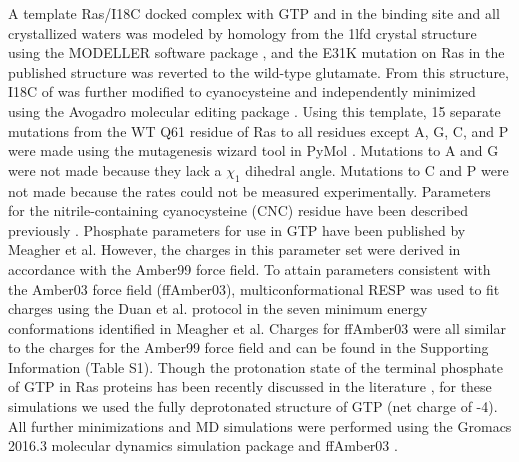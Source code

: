 A template Ras/\RalB{}I18C docked complex with GTP and  in the binding site and all crystallized waters was modeled by homology from the 1lfd crystal structure\cite{Huang1998} using the MODELLER software package \cite{Marti-Renom2000, Sali1993, Fiser2000}, and the E31K mutation on Ras in the published structure was reverted to the wild-type glutamate. 
From this structure, I18C of \RalB{} was further modified to cyanocysteine and independently minimized using the Avogadro molecular editing package \cite{Hanwell2012}. 
Using this template, 15 separate mutations from the WT Q61 residue of Ras to all residues except A, G, C, and P were made using the mutagenesis wizard tool in PyMol \cite{DeLano2002}.
Mutations to A and G were not made because they lack a $\chi_1$ dihedral angle. 
Mutations to C and P were not made because the rates could not be measured experimentally.
Parameters for the nitrile-containing cyanocysteine (CNC) residue have been described previously \cite{Stafford2010, Ensign2011}.
Phosphate parameters for use in GTP have been published by Meagher et al\cite{Meagher2003}.
However, the charges in this parameter set were derived in accordance with the Amber99 force field. 
To attain parameters consistent with the Amber03 force field (ffAmber03), multiconformational RESP\cite{Cornell1993, Bayly1993, Cieplak1995} was used to fit charges using the Duan et al. protocol\cite{Duan2003} in the seven minimum energy conformations identified in Meagher et al. 
Charges for ffAmber03 were all similar to the charges for the Amber99 force field and can be found in the Supporting Information (Table S1). 
Though the protonation state of the terminal phosphate of GTP in Ras proteins has been recently discussed in the literature \cite{Knihtila2015, Mann2018}, for these simulations we used the fully deprotonated structure of GTP (net charge of -4). 
All further minimizations and MD simulations were performed using the Gromacs 2016.3 molecular dynamics simulation package\cite{Berendsen1995, Lindahl2001, VanDerSpoel2005, Miyake-Stoner2009, Hess2008, Pronk2013, Pall2015, Abraham2015} and ffAmber03 \cite{Duan2003, Sorin2005}.

